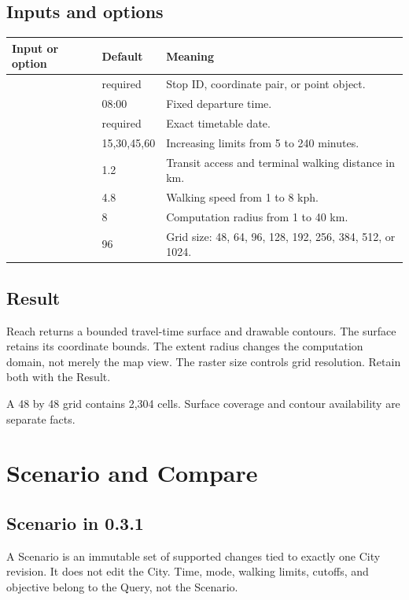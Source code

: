 \documentclass[10pt,letterpaper]{article}
\begin{document}
\subsection{Inputs and options}

\begin{longtable}{P{1.62in} P{1.08in} P{3.60in}}
\toprule
\textbf{Input or option} & \textbf{Default} & \textbf{Meaning} \\
\midrule
\endhead
{} & required & Stop ID, coordinate pair, or point object. \\
 & 08:00 & Fixed departure time. \\
 & required & Exact timetable date. \\
 & 15,30,45,60 & Increasing limits from 5 to 240 minutes. \\
 & 1.2 & Transit access and terminal walking distance in km. \\
 & 4.8 & Walking speed from 1 to 8 kph. \\
 & 8 & Computation radius from 1 to 40 km. \\
 & 96 & Grid size: 48, 64, 96, 128, 192, 256, 384, 512, or 1024. \\
\bottomrule
\end{longtable}

\subsection{Result}

Reach returns a bounded travel-time surface and drawable contours. The surface retains its coordinate bounds. The extent radius changes the computation domain, not merely the map view. The raster size controls grid resolution. Retain both with the Result.

A 48 by 48 grid contains 2,304 cells. Surface coverage and contour availability are separate facts.

\section{Scenario and Compare}

\subsection{Scenario in 0.3.1}

A Scenario is an immutable set of supported changes tied to exactly one City revision. It does not edit the City. Time, mode, walking limits, cutoffs, and objective belong to the Query, not the Scenario.
\end{document}
